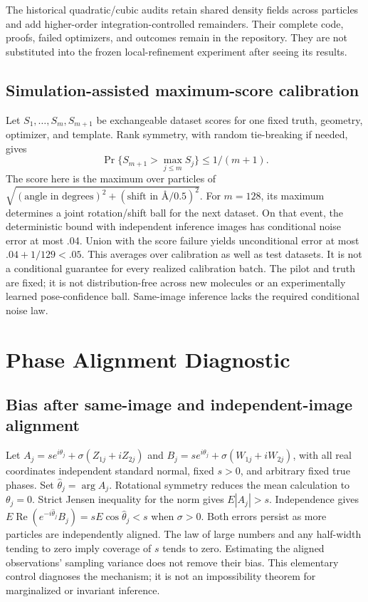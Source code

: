 The historical quadratic/cubic audits retain shared density fields across
particles and add higher-order integration-controlled remainders. Their
complete code, proofs, failed optimizers, and outcomes remain in the
repository. They are not substituted into the frozen local-refinement
experiment after seeing its results.

\subsection{Simulation-assisted maximum-score calibration}
Let $S_1,\ldots,S_m,S_{m+1}$ be exchangeable dataset scores for one fixed
truth, geometry, optimizer, and template. Rank symmetry, with random
tie-breaking if needed, gives
\[
\Pr\{S_{m+1}>\max_{j\le m}S_j\}\le1/(m+1).
\]
The score here is the maximum over particles of
$\sqrt{(\text{angle in degrees})^2+(\text{shift in \AA}/0.5)^2}$.
For $m=128$, its maximum determines a joint rotation/shift ball for the
next dataset. On that event, the deterministic bound with independent
inference images has conditional noise error at most .04. Union with the
score failure yields unconditional error at most $.04+1/129<.05$.
This averages over calibration as well as test datasets. It is not a
conditional guarantee for every realized calibration batch. The pilot and
truth are fixed; it is not distribution-free across new molecules or an
experimentally learned pose-confidence ball. Same-image inference lacks
the required conditional noise law.

\section{Phase Alignment Diagnostic}\label{app:phase}
\subsection{Bias after same-image and independent-image alignment}
Let $A_j=se^{i\theta_j}+\sigma(Z_{1j}+iZ_{2j})$ and
$B_j=se^{i\theta_j}+\sigma(W_{1j}+iW_{2j})$, with all real coordinates
independent standard normal, fixed $s>0$, and arbitrary fixed true phases.
Set $\widehat\theta_j=\arg A_j$. Rotational symmetry reduces the mean
calculation to $\theta_j=0$. Strict Jensen inequality for the norm gives
$E|A_j|>s$. Independence gives
$E\operatorname{Re}(e^{-i\widehat\theta_j}B_j)
=sE\cos\widehat\theta_j<s$ when $\sigma>0$.
Both errors persist as more particles are independently aligned. The law
of large numbers and any half-width tending to zero imply coverage of $s$
tends to zero. Estimating the aligned observations' sampling variance does
not remove their bias. This elementary control diagnoses the mechanism;
it is not an impossibility theorem for marginalized or invariant inference.

